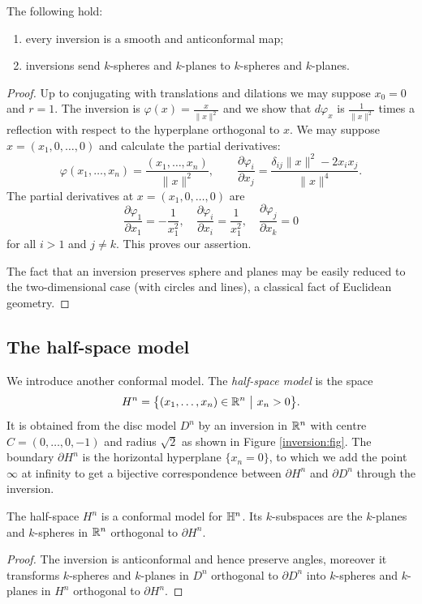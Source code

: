 \begin{prop} \label{inversione:prop}
The following hold:
\begin{enumerate}
\item every inversion is a smooth and anticonformal map;
\item inversions send $k$-spheres and $k$-planes to $k$-spheres and $k$-planes.
\end{enumerate}
\end{prop}
\begin{proof}
Up to conjugating with translations and dilations we may suppose $x_0=0$ and $r=1$. The inversion is $\varphi(x) = \frac{x}{\|x\|^2}$ and we show that $d\varphi_x$ is $\frac 1{\|x\|^2}$ times a reflection with respect to the hyperplane orthogonal to $x$. We may suppose $x=(x_1,0,\ldots,0)$ and calculate the partial derivatives:
$$ 
\varphi(x_1,\ldots,x_n) = \frac{(x_1,\ldots, x_n)}{\|x\|^2}, \qquad
\frac{\partial \varphi_i}{\partial x_j} = \frac{\delta_{ij} \|x\|^2 - 2x_ix_j}{\|x\|^4}.
$$
The partial derivatives at $x=(x_1,0,\ldots, 0)$ are
$$\frac{\partial \varphi_1}{\partial x_1} = -\frac {1}{x_1^2}, \quad  \frac{\partial \varphi_i}{\partial x_i} = \frac {1}{x_1^2}, \quad \frac{\partial \varphi_j}{\partial x_k} = 0$$
for all $i>1$ and $j\neq k$. This proves our assertion.

The fact that an inversion preserves sphere and planes may be easily reduced to the two-dimensional case (with circles and lines), a classical fact of Euclidean geometry.
\end{proof}

\subsection{The half-space model}
We introduce another conformal model. The \emph{half-space model} is the space
$$H^n = \big\{(x_1,\ldots,x_n)\in \mathbb{R}^n \ \big|\ x_n>0\big\}.$$
It is obtained from the disc model $D^n$ by an inversion in $\mathbb{R}^n$ with centre $C=(0,\ldots,0,-1)$ and radius $\sqrt 2$ as shown in Figure \ref{inversion:fig}. The boundary $\partial H^n$ is the horizontal hyperplane $\{x_n=0\}$, to which we add the point $\infty$ at infinity to get a bijective correspondence between $\partial H^n$ and $\partial D^n$ through the inversion.

\begin{prop} The half-space $H^n$ is a conformal model for $\mathbb{H}^n$. Its $k$-subspaces are the $k$-planes and $k$-spheres in $\mathbb{R}^n$ orthogonal to $\partial H^n$. 
\end{prop}
\begin{proof}
The inversion is anticonformal and hence preserve angles, moreover it transforms $k$-spheres and $k$-planes in $D^n$ orthogonal to $\partial D^n$ into $k$-spheres and $k$-planes in $H^n$ orthogonal to $\partial H^n$.
\end{proof}

